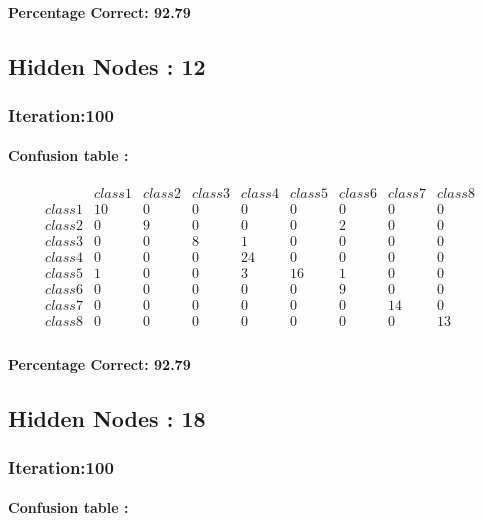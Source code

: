 \documentclass[12pt]{article}
\begin{document}
\paragraph*{Percentage Correct: 92.79}  

\subsection*{Hidden Nodes : 12}  

\subsubsection*{Iteration:100}
\paragraph*{Confusion table :}

\[
  \begin{matrix}
   & class1 & class2 & class3 & class4 & class5 & class6 & class7 & class8 \\
class1 &    10 & 0 & 0 & 0 & 0 & 0 & 0 & 0 \\
class2 &    0 & 9 & 0 & 0 & 0 & 2 & 0 & 0 \\
class3 &    0 & 0 & 8 & 1 & 0 & 0 & 0 & 0 \\
class4 &    0 & 0 & 0 & 24 & 0 & 0 & 0 & 0 \\
class5 &     1 & 0 & 0 & 3 & 16 & 1 & 0 & 0 \\
class6 &    0 & 0 & 0 & 0 & 0 & 9 & 0 & 0 \\
class7 &    0 & 0 & 0 & 0 & 0 & 0 & 14 & 0 \\
class8 &    0 & 0 & 0 & 0 & 0 & 0 & 0 & 13 \\
  \end{matrix}
\]
\paragraph*{Percentage Correct: 92.79} 
\subsection*{Hidden Nodes : 18}  

\subsubsection*{Iteration:100}
\paragraph*{Confusion table :}
\end{document}

